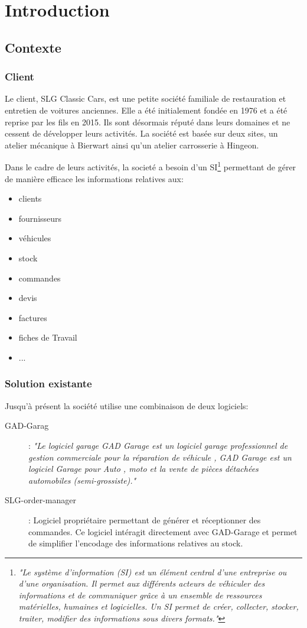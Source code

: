 \section{Introduction}
\subsection{Contexte}
\subsubsection{Client}

Le client, SLG Classic Cars, est une petite société familiale de restauration et entretien de voitures anciennes. Elle a été initialement fondée en 1976 et a été reprise par les fils en 2015. Ils sont désormais réputé dans leurs domaines et ne cessent de développer leurs activités. La société est basée sur deux sites, un atelier mécanique à Bierwart ainsi qu'un atelier carrosserie à Hingeon. 

\newpara

Dans le cadre de leurs activités, la societé a besoin d'un SI\footnote{\textit{"Le système d’information (SI) est un élément central d’une entreprise ou d’une organisation. Il permet aux différents acteurs de véhiculer des informations et de communiquer grâce à un ensemble de ressources matérielles, humaines et logicielles. Un SI permet de créer, collecter, stocker, traiter, modifier des informations sous divers formats."}\cite{SI}} permettant de gérer de manière efficace les informations relatives aux:
\begin{itemize}
  \item clients 
  \item fournisseurs
  \item véhicules
  \item stock
  \item commandes
  \item devis
  \item factures
  \item fiches de Travail
  \item ...
\end{itemize}

\subsubsection{Solution existante} 

Jusqu'à présent la société utilise une combinaison de deux logiciels:
\begin{description}
  \item[GAD-Garag] : \textit{"Le logiciel garage GAD Garage est un logiciel garage professionnel de gestion commerciale pour la réparation de véhicule , GAD Garage est un logiciel Garage pour Auto , moto et la vente de pièces détachées automobiles (semi-grossiste)."}\cite{GAD}
  \item[SLG-order-manager] : Logiciel propriétaire permettant de générer et réceptionner des commandes. Ce logiciel intéragit directement avec GAD-Garage et permet de simplifier l'encodage des informations relatives au stock. 
\end{description}


